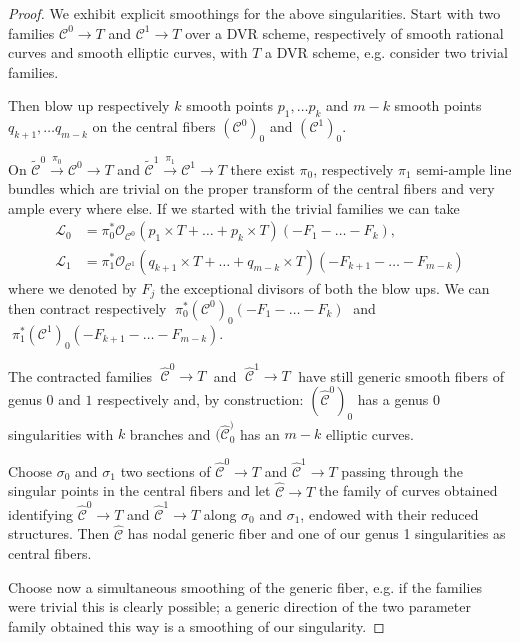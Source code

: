 \documentclass[11pt]{amsart}
\newcommand{\OO}{\mathcal O}
\renewcommand{\to}{\rightarrow}
\newcommand{\cC}{\mathcal C}
\theoremstyle{plain}
\theoremstyle{definition}
\begin{document}
\begin{proof}
We exhibit explicit smoothings for the above singularities.
Start with two families $\cC^0\to T$ and $\cC^1\to T$ over a DVR scheme, respectively of smooth rational curves and smooth elliptic curves, with $T$ a DVR scheme, e.g. consider two trivial families.

 Then blow up respectively $k$ smooth points $p_1,\dots p_k$ and  $m-k$ smooth points $q_{k+1},\dots q_{m-k}$ on the central fibers  $(\cC^0)_0$ and $(\cC^1)_0.$
 
On  $\widetilde{\cC}^0\xrightarrow{\pi_0} \cC^0\to T$ and $\widetilde{\cC}^1\xrightarrow{\pi_1} \cC^1\to T$ there exist $\pi_0$, respectively $\pi_1$ semi-ample line bundles which are trivial on the proper transform of the central fibers and very ample every where else.
If we started with the trivial families we can take \begin{align*}
\mathcal L_0&=\pi_0^*\OO_{\cC^0}(p_1\times T+\dots+ p_k\times T)(-F_1-\dots -F_k),\\
 \mathcal L_1&=\pi_1^*\OO_{\cC^1}(q_{k+1}\times T+\dots+ q_{m-k}\times T)(-F_{k+1}-\dots -F_{m-k})
\end{align*}
where we denoted by $F_j$ the exceptional divisors of both the blow ups.
We can then contract respectively  $\;\pi_0^*(\cC^0)_0(-F_1-\dots -F_k)\;$ and $\;\pi_1^*(\cC^1)_0(-F_{k+1}-\dots -F_{m-k}).$

The contracted families   $\;\hat{\cC}^0\to T\;$ and $\;\hat{\cC}^1\to T\;$ have still generic smooth fibers of genus $0$ and $1$ respectively and, by construction: $(\hat{\cC}^0)_0$ has a genus $0$ singularities with $k$ branches and $(\hat{\cC}^)_0$ has an $m-k$ elliptic curves\cite[Lemma~2.12]{SMY1}.

Choose $\sigma_0$ and $\sigma_1$ two sections of $\hat{\cC}^0\to T$ and $\hat{\cC}^1\to T$ passing through the singular points in the central fibers and let $\hat{\cC}\to T$ the family of curves obtained identifying $\hat{\cC}^0\to T$ and $\hat{\cC}^1\to T$ along $\sigma_0$ and $\sigma_1$, endowed with their reduced structures.
Then $\hat{\cC}$ has nodal generic fiber and one of our genus 1 singularities as central fibers.

Choose now a simultaneous smoothing of the generic fiber, e.g. if the families were trivial this is clearly possible; a generic direction of the two parameter family obtained this way is a smoothing of our singularity.
\end{proof}
\end{document}
